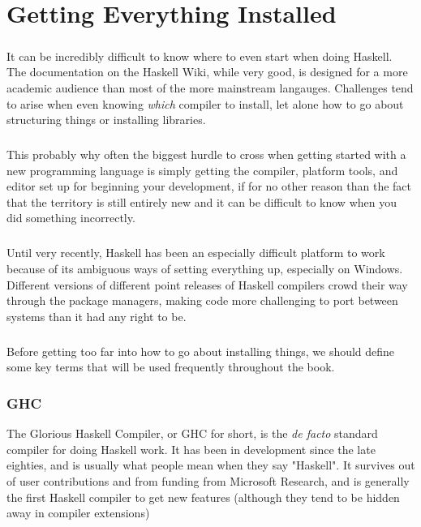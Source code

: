 \chapter{Getting Everything Installed}


\paragraph{}
It can be incredibly difficult to know where to even start when doing Haskell.  The documentation on the Haskell Wiki, while very good, is designed for a more academic audience than most of the more mainstream langauges. Challenges tend to arise when even knowing \textit{which} compiler to install, let alone how to go about structuring things or installing libraries.  

\paragraph{}
This probably why often the biggest hurdle to cross when getting started with a new programming language is simply getting the compiler, platform tools, and editor set up for beginning your development, if for no other reason than the fact that the territory is still entirely new and it can be difficult to know when you did something incorrectly.  

\paragraph{}
Until very recently, Haskell has been an especially difficult platform to work because of its ambiguous ways of setting everything up, especially on Windows. Different versions of different point releases of Haskell compilers crowd their way through the package managers, making code more challenging to port between systems than it had any right to be. 

\paragraph{}
Before getting too far into how to go about installing things, we should define some key terms that will be used frequently throughout the book. 


\subsection{GHC}
The Glorious Haskell Compiler, or GHC for short, is the \textit{de facto} standard compiler for doing Haskell work.  It has been in development since the late eighties, and is usually what people mean when they say "Haskell".  It survives out of user contributions and from funding from Microsoft Research, and is generally the first Haskell compiler to get new features (although they tend to be hidden away in compiler extensions) 

